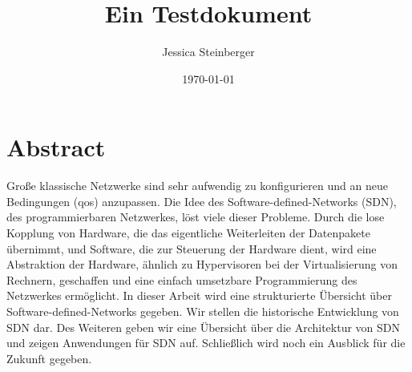 \documentclass[twoside,12pt]{scrartcl}
\title{Ein Testdokument}
\author{Jessica Steinberger}
\date{\today}
\begin{document}
	
	
	
	\pagestyle{scrheadings}
	\clearscrheadfoot
	\ohead{\leftmark}
	\ifoot{\pagemark} 
	\setheadsepline{1pt} 
	\setfootsepline{1pt}
	
	
	\maketitle
	
	\tableofcontents
	
	\newpage
	
	\printglossary[type=\acronymtype,style=longwithindent]
	\newpage
	
	\printglossary[type=symbolslist,style=long]
	
	\newpage
	
	\section{Abstract}
	
	Große klassische Netzwerke sind sehr aufwendig zu konfigurieren und an neue Bedingungen (qos) anzupassen. Die Idee des Software-defined-Networks (SDN), des programmierbaren Netzwerkes, löst viele dieser Probleme. Durch die lose Kopplung von Hardware, die das eigentliche Weiterleiten der Datenpakete übernimmt, und Software, die zur Steuerung der Hardware dient, wird eine Abstraktion der Hardware, ähnlich zu Hypervisoren bei der Virtualisierung von Rechnern, geschaffen und eine einfach umsetzbare Programmierung des Netzwerkes ermöglicht. In dieser Arbeit wird eine strukturierte Übersicht über Software-defined-Networks gegeben. Wir stellen die historische Entwicklung von SDN dar. Des Weiteren geben wir eine Übersicht über die Architektur von SDN und zeigen Anwendungen für SDN auf. Schließlich wird noch ein Ausblick für die Zukunft gegeben.
	
\end{document}
